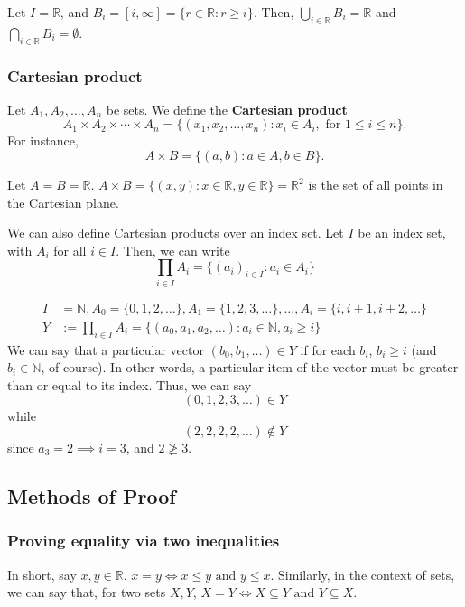 \documentclass[12pt,oneside]{article}
\begin{document}
\begin{example}
  Let $I = \mathbb{R}$, and $B_i = [i, \infty] = \{r \in \mathbb{R} : r \geq i\}$. Then, $\bigcup_{i \in \mathbb{R}} B_i = \mathbb{R}$ and $\bigcap_{i \in \mathbb{R}} B_i = \emptyset$.
\end{example}

\subsubsection{Cartesian product}

Let $A_1, A_2, \dots, A_n$ be sets. We define the \textbf{Cartesian product} \[A_1 \times A_2 \times \cdots \times A_n = \{(x_1, x_2, \dots, x_n) : x_i \in A_i, \text{ for } 1 \leq i \leq n\}.\] For instance, \[A \times B = \{(a, b) : a \in A, b \in B\}.\]

\begin{example}
  Let $A = B = \mathbb{R}$. $A \times B = \{(x,y) : x \in \mathbb{R}, y \in \mathbb{R} \} = \mathbb{R}^2$ is the set of all points in the Cartesian plane.
\end{example}

We can also define Cartesian products over an index set. Let $I$ be an index set, with $A_i$ for all $i \in I$. Then, we can write \[\prod_{i \in I}A_i = \{(a_i)_{i \in I} : a_i \in A_i\}\]

\begin{example}
  \begin{align*}
    I &= \mathbb{N}, A_0 = \{0, 1, 2, \dots\}, A_1 = \{1, 2, 3, \dots\}, ... , A_i = \{i, i+1, i+2, \dots \}\\
  Y &:= \prod_{i \in I}A_i = \{(a_0, a_1, a_2, \dots):a_i \in \mathbb{N}, a_i \geq i\}
  \end{align*}
  We can say that a particular vector $(b_0, b_1, \dots) \in Y$ if for each $b_i$, $b_i \geq i$ (and $b_i \in \mathbb{N}$, of course). In other words, a particular item of the vector must be greater than or equal to its index. Thus, we can say \[(0, 1, 2, 3, \dots) \in Y\] while \[(2,2,2, 2, \dots) \notin Y\] since $a_3 = 2 \implies i = 3$, and $2 \ngeq 3$.
\end{example}

\subsection{Methods of Proof}
\subsubsection{Proving equality via two inequalities}
In short, say $x, y \in \mathbb{R}$. $x = y \iff x \leq y \text{ and } y \leq x$. Similarly, in the context of sets, we can say that, for two sets $X, Y$, $X = Y \iff X \subseteq Y \text{ and } Y \subseteq X$.
\end{document}
